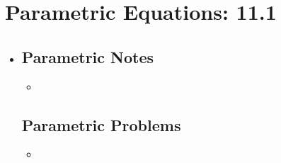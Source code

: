 \section{Parametric Equations: 11.1}
\begin{itemize}
  \item[]

  \subsection{Parametric Notes}
  \begin{itemize}
    \item
  \end{itemize}

  \subsection{Parametric Problems}
  \begin{itemize}
    \item
  \end{itemize}

\end{itemize}
